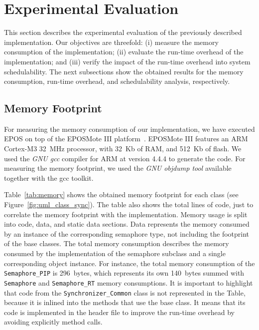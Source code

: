 \section{Experimental Evaluation}
\label{sec:eval}

This section describes the experimental evaluation of the previously described 
implementation. Our objectives are threefold: (i) measure the memory 
consumption of the implementation; (ii) evaluate the run-time overhead of the 
implementation; and (iii) verify the impact of the run-time overhead into 
system schedulability. The next subsections show the obtained results for the 
memory consumption, run-time overhead, and schedulability analysis, 
respectively.

\subsection{Memory Footprint}

For measuring the memory consumption of our implementation, we have executed 
EPOS on top of the EPOSMote III platform~\cite{epos}. EPOSMote III features an 
ARM Cortex-M3 32~MHz processor, with 32~Kb of RAM, and 512~Kb of flash. We used 
the \emph{GNU gcc} compiler for ARM at version 4.4.4 to generate the code. For 
measuring the memory footprint, we used the \emph{GNU objdump tool} available 
together with the gcc toolkit.

Table~\ref{tab:memory} shows the obtained memory footprint for each class (see 
Figure~\ref{fig:uml_class_sync}). The table also shows the total lines of code, 
just to correlate the memory footprint with the implementation. Memory usage is 
split into code, data, and static data sections. Data represents the memory 
consumed by an instance of the corresponding semaphore type, not including the 
footprint of the base classes. The total memory consumption describes the memory 
consumed by the implementation of the semaphore subclass and a single 
corresponding object instance. For instance, the total memory consumption of 
the \texttt{Semaphore\_PIP} is 296~bytes, which represents its own 140~bytes 
summed with \texttt{Semaphore} and \texttt{Semaphore\_RT} memory consumptions. 
It is important to highlight that code from the \texttt{Synchronizer\_Common} 
class is not represented in the Table, because it is inlined into the methods 
that use the base class. It means that its code is implemented in the header 
file to improve the run-time overhead by avoiding explicitly method calls. 

